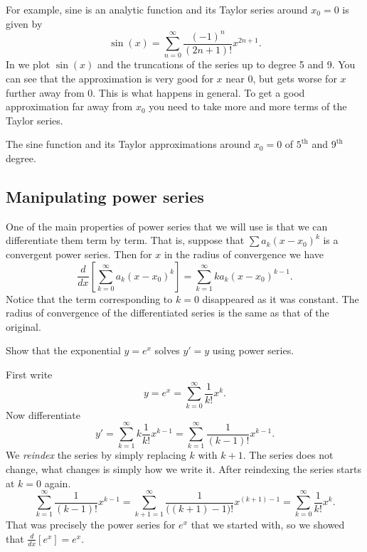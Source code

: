 \documentclass{ximera}
\begin{document}
For example, sine is an analytic function and its Taylor series around $x_0 = 0$ is given by
\begin{equation*}
    \sin(x) = \sum_{n=0}^\infty \frac{{(-1)}^n}{(2n+1)!}  x^{2n+1} .
\end{equation*}
In  we plot $\sin(x)$ and the truncations of the series up to degree 5 and 9.  You can see that the approximation is very good for $x$ near 0, but gets worse for $x$ further away from 0.  This is what happens in general. To get a good approximation far away from $x_0$ you need to take more and more terms of the Taylor series.

\begin{myfig}
    \capstart
    \caption{The sine function and its Taylor approximations around $x_0=0$ of $5^{\text{th}}$ and $9^{\text{th}}$ degree.\label{ps:sin}}
\end{myfig}

\subsection{Manipulating power series}

One of the main properties of power series that we will use is that we can differentiate them term by term.  That is, suppose that  $\sum a_k {(x-x_0)}^k$ is a convergent power series.  Then for $x$ in the radius of convergence we have
\begin{equation*}
    \frac{d}{dx} \left[\sum_{k=0}^\infty a_k {(x-x_0)}^k\right] = \sum_{k=1}^\infty k a_k {(x-x_0)}^{k-1} .
\end{equation*}
Notice that the term corresponding to $k=0$ disappeared as it was constant.  The radius of convergence of the differentiated series is the same as that of the original.

\begin{example}
    Show that the exponential $y=e^x$ solves $y'=y$ using power series.
\end{example}

\begin{exampleSol}
    First write
    \begin{equation*}
        y = e^x = \sum_{k=0}^\infty \frac{1}{k!} x^k .
    \end{equation*}
    Now differentiate
    \begin{equation*}
        y' = \sum_{k=1}^\infty k \frac{1}{k!} x^{k-1} = \sum_{k=1}^\infty \frac{1}{(k-1)!} x^{k-1} .
    \end{equation*}
    We \emph{reindex} the series by simply replacing $k$ with $k+1$.  The series does not change, what changes is simply how we write it.  After reindexing the series starts at $k=0$ again.
    \begin{equation*}
        \sum_{k=1}^\infty \frac{1}{(k-1)!} x^{k-1} = \sum_{k+1=1}^\infty \frac{1}{\bigl((k+1)-1\bigr)!} x^{(k+1)-1} = \sum_{k=0}^\infty \frac{1}{k!} x^k .
    \end{equation*}
    That was precisely the power series for $e^x$ that we started with, so we showed that $\frac{d}{dx} [ e^x ] = e^x$.
\end{exampleSol}
\end{document}
